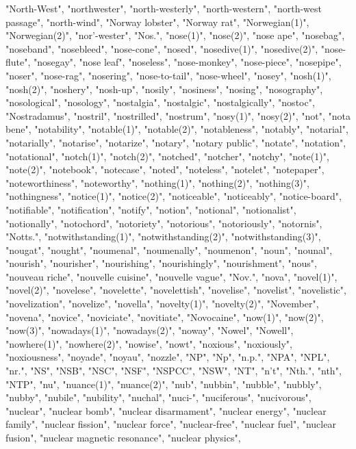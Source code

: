 "North-West",
"northwester",
"north-westerly",
"north-western",
"north-west passage",
"north-wind",
"Norway lobster",
"Norway rat",
"Norwegian(1)",
"Norwegian(2)",
"nor'-wester",
"Nos.",
"nose(1)",
"nose(2)",
"nose ape",
"nosebag",
"noseband",
"nosebleed",
"nose-cone",
"nosed",
"nosedive(1)",
"nosedive(2)",
"nose-flute",
"nosegay",
"nose leaf",
"noseless",
"nose-monkey",
"nose-piece",
"nosepipe",
"noser",
"nose-rag",
"nosering",
"nose-to-tail",
"nose-wheel",
"nosey",
"nosh(1)",
"nosh(2)",
"noshery",
"nosh-up",
"nosily",
"nosiness",
"nosing",
"nosography",
"nosological",
"nosology",
"nostalgia",
"nostalgic",
"nostalgically",
"nostoc",
"Nostradamus",
"nostril",
"nostrilled",
"nostrum",
"nosy(1)",
"nosy(2)",
"not",
"nota bene",
"notability",
"notable(1)",
"notable(2)",
"notableness",
"notably",
"notarial",
"notarially",
"notarise",
"notarize",
"notary",
"notary public",
"notate",
"notation",
"notational",
"notch(1)",
"notch(2)",
"notched",
"notcher",
"notchy",
"note(1)",
"note(2)",
"notebook",
"notecase",
"noted",
"noteless",
"notelet",
"notepaper",
"noteworthiness",
"noteworthy",
"nothing(1)",
"nothing(2)",
"nothing(3)",
"nothingness",
"notice(1)",
"notice(2)",
"noticeable",
"noticeably",
"notice-board",
"notifiable",
"notification",
"notify",
"notion",
"notional",
"notionalist",
"notionally",
"notochord",
"notoriety",
"notorious",
"notoriously",
"notornis",
"Notts.",
"notwithstanding(1)",
"notwithstanding(2)",
"notwithstanding(3)",
"nougat",
"nought",
"noumenal",
"noumenally",
"noumenon",
"noun",
"nounal",
"nourish",
"nourisher",
"nourishing",
"nourishingly",
"nourishment",
"nous",
"nouveau riche",
"nouvelle cuisine",
"nouvelle vague",
"Nov.",
"nova",
"novel(1)",
"novel(2)",
"novelese",
"novelette",
"novelettish",
"novelise",
"novelist",
"novelistic",
"novelization",
"novelize",
"novella",
"novelty(1)",
"novelty(2)",
"November",
"novena",
"novice",
"noviciate",
"novitiate",
"Novocaine",
"now(1)",
"now(2)",
"now(3)",
"nowadays(1)",
"nowadays(2)",
"noway",
"Nowel",
"Nowell",
"nowhere(1)",
"nowhere(2)",
"nowise",
"nowt",
"noxious",
"noxiously",
"noxiousness",
"noyade",
"noyau",
"nozzle",
"NP",
"Np",
"n.p.",
"NPA",
"NPL",
"nr.",
"NS",
"NSB",
"NSC",
"NSF",
"NSPCC",
"NSW",
"NT",
"n't",
"Nth.",
"nth",
"NTP",
"nu",
"nuance(1)",
"nuance(2)",
"nub",
"nubbin",
"nubble",
"nubbly",
"nubby",
"nubile",
"nubility",
"nuchal",
"nuci-",
"nuciferous",
"nucivorous",
"nuclear",
"nuclear bomb",
"nuclear disarmament",
"nuclear energy",
"nuclear family",
"nuclear fission",
"nuclear force",
"nuclear-free",
"nuclear fuel",
"nuclear fusion",
"nuclear magnetic resonance",
"nuclear physics",
